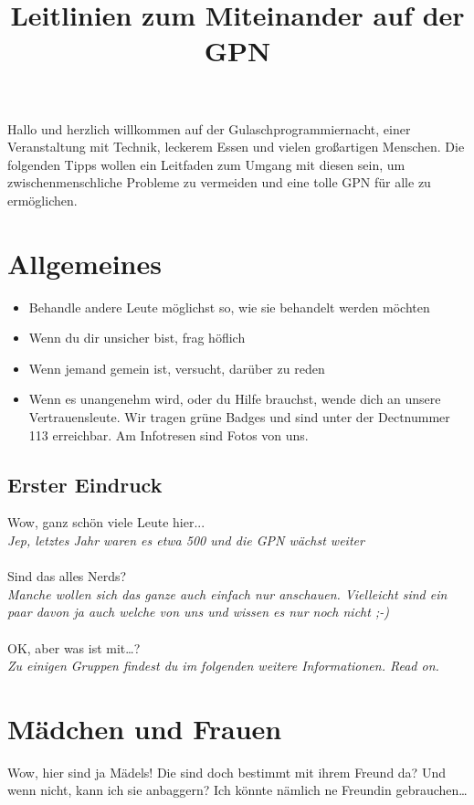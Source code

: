 \documentclass[10pt]{leaflet}
\date{\vspace{-5ex}}
\title{Leitlinien zum Miteinander auf der GPN}
\begin{document}
\maketitle

Hallo und herzlich willkommen auf der Gulaschprogrammiernacht, einer
Veranstaltung mit Technik, leckerem Essen und vielen großartigen
Menschen. Die folgenden Tipps wollen ein Leitfaden zum Umgang mit
diesen sein, um zwischenmenschliche Probleme zu vermeiden und eine
tolle GPN für alle zu ermöglichen.



\section{Allgemeines}
\label{sec-1}
\begin{itemize}
\item Behandle andere Leute möglichst so, wie sie behandelt werden möchten
\item Wenn du dir unsicher bist, frag höflich
\item Wenn jemand gemein ist, versucht, darüber zu reden
\item Wenn es unangenehm wird, oder du Hilfe brauchst, wende dich an
  unsere Vertrauensleute. Wir tragen grüne Badges und sind unter der
  Dectnummer 113  erreichbar. Am Infotresen sind Fotos von uns.
\end{itemize}


\subsection{Erster Eindruck}
\label{sec-1-1}
Wow, ganz schön viele Leute hier...\\
\emph{Jep, letztes Jahr waren es etwa 500 und die GPN wächst weiter}\\\\
Sind das alles Nerds?\\
\emph{Manche wollen sich das ganze auch einfach nur anschauen. Vielleicht
sind ein paar davon ja auch welche von uns und wissen es nur noch
nicht ;-)}\\\\
OK, aber was ist mit\ldots{}?\\
\emph{Zu einigen Gruppen findest du im folgenden weitere
Informationen. Read on.}


\section{Mädchen und Frauen}
\label{sec-2}
Wow, hier sind ja Mädels! Die sind doch bestimmt mit ihrem Freund da?
Und wenn nicht, kann ich sie anbaggern? Ich könnte nämlich ne Freundin
gebrauchen\ldots{}
\end{document}
